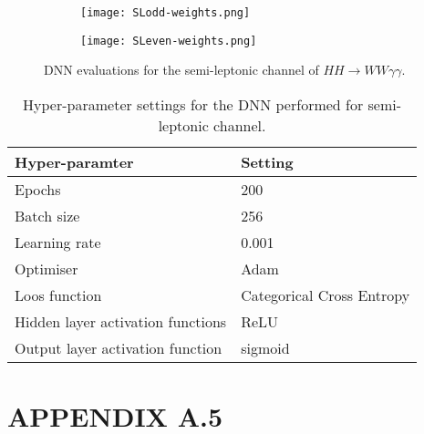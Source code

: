 \begin{figure*}[h!]
    \centering
    \begin{subfigure}[b]{0.475\textwidth}
        \centering
        \texttt{[image: SLodd-weights.png]}
        \vspace{-0.5cm}
    \end{subfigure}
    \hfill
    \begin{subfigure}[b]{0.475\textwidth}  
        \centering 
        \texttt{[image: SLeven-weights.png]}
        \vspace{-0.5cm}
    \end{subfigure}
    \caption{\small DNN evaluations for the semi-leptonic channel of $HH\rightarrow{WW\gamma\gamma}$.} 
\end{figure*}

\begin{table}[h!]
    \centering
    \caption{Hyper-parameter settings for the DNN performed for semi-leptonic channel.}
    \begin{tabular}{ l l }
    \hline
    Hyper-paramter & Setting \\
    \hline
    Epochs & 200 \\
    Batch size & 256 \\
    Learning rate & 0.001 \\
    Optimiser & Adam \\
    Loos function & Categorical Cross Entropy \\
    Hidden layer activation functions & ReLU \\
    Output layer activation function & sigmoid \\
    \hline
    \end{tabular}
    \label{hasOneL_dnnpars}
\end{table}


\section*{APPENDIX A.5}

